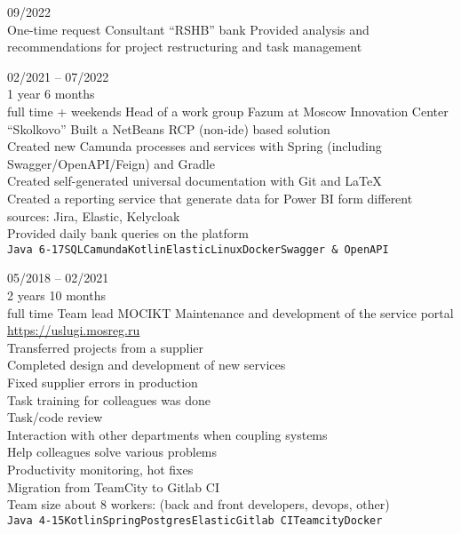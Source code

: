 


\begin{entrylist}
    \entry
    {09/2022\\\footnotesize{One-time request}}
    {Consultant}
    {\enquote{RSHB} bank}
    {
        Provided analysis and recommendations for project restructuring and task management
    }

    \entry
    {02/2021 -- 07/2022\\\footnotesize{1 year 6 months\\full time + weekends}}
    {Head of a work group}
    {Fazum at Moscow Innovation Center \enquote{Skolkovo}}
    {
        Built a NetBeans RCP (non-ide) based solution \\
    Created new Camunda processes and services with Spring (including Swagger/OpenAPI/Feign) and Gradle \\
    Created self-generated universal documentation with Git and LaTeX \\
    Created a reporting service that generate data for Power BI form different sources: Jira, Elastic, Kelycloak \\
    Provided daily bank queries on the platform \\
    \texttt{Java 6-17}\slashsep\texttt{SQL}\slashsep\texttt{Camunda}\slashsep\texttt{Kotlin}\slashsep\texttt{Elastic}\slashsep\texttt{Linux}\slashsep\texttt{Docker}\slashsep\texttt{Swagger \& OpenAPI}
    }

    \entry
    {05/2018 -- 02/2021\\\footnotesize{2 years 10 months\\full time}}
    {Team lead}
    {MOCIKT}
    {
        Maintenance and development of the service portal \url{https://uslugi.mosreg.ru} \\
        Transferred projects from a supplier \\
        Completed design and development of new services \\
        Fixed supplier errors in production \\
        Task training for colleagues was done \\
        Task/code review \\
        Interaction with other departments when coupling systems \\
        Help colleagues solve various problems \\
        Productivity monitoring, hot fixes \\
        Migration from TeamCity to Gitlab CI \\
    Team size about 8 workers: (back and front developers, devops, other) \\
    \texttt{Java 4-15}\slashsep\texttt{Kotlin}\slashsep\texttt{Spring}\slashsep\texttt{Postgres}\slashsep\texttt{Elastic}\slashsep\texttt{Gitlab CI}\slashsep\texttt{Teamcity}\slashsep\texttt{Docker}
	}


\end{entrylist}
